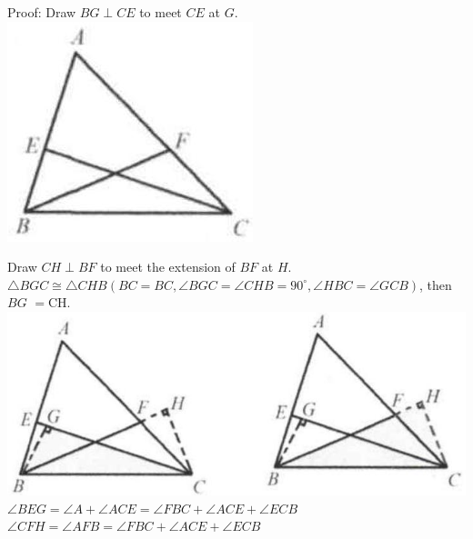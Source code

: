 \documentclass[10pt]{article}
\begin{document}
Proof:
Draw \(B G \perp C E\) to meet \(C E\) at \(G\).\\
\includegraphics[max width=\textwidth, center]{2025_04_17_97bc1f7e44d93c271a88g-085(2)}

Draw \(C H \perp B F\) to meet the extension of \(B F\) at \(H\).\\
\(\triangle B G C \cong \triangle C H B\left(B C=B C, \angle B G C=\angle C H B=90^{\circ}, \angle H B C=\angle G C B\right)\), then \(B G\) \(=\mathrm{CH}\).\\
\includegraphics[max width=\textwidth, center]{2025_04_17_97bc1f7e44d93c271a88g-085(1)}\\
\(\angle B E G=\angle A+\angle A C E=\angle F B C+\angle A C E+\angle E C B\)\\
\(\angle C F H=\angle A F B=\angle F B C+\angle A C E+\angle E C B\)
\end{document}
